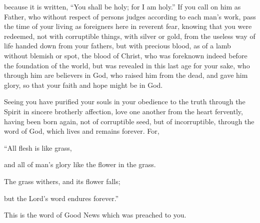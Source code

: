 {because it is written, “You shall be holy; for I am holy.”
If you call on him as Father, who without respect of persons judges according to each man’s work, pass the time of your living as foreigners here in reverent fear,
knowing that you were redeemed, not with corruptible things, with silver or gold, from the useless way of life handed down from your fathers,
but with precious blood, as of a lamb without blemish or spot, the blood of Christ,
who was foreknown indeed before the foundation of the world, but was revealed in this last age for your sake,
who through him are believers in God, who raised him from the dead, and gave him glory, so that your faith and hope might be in God.
\par }{\PP {}Seeing you have purified your souls in your obedience to the truth through the Spirit in sincere brotherly affection, love one another from the heart fervently,
having been born again, not of corruptible seed, but of incorruptible, through the word of God, which lives and remains forever.
For,
\par }{\Q “All flesh is like grass,
\par }{\QB and all of man’s glory like the flower in the grass.
\par }{\Q The grass withers, and its flower falls;
\par }{\QB {}but the Lord’s word endures forever.”
\par }{\PP This is the word of Good News which was preached to you.

}
